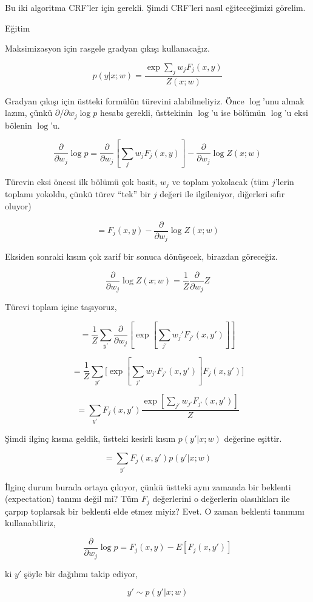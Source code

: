 \documentclass[12pt,fleqn]{article}\usepackage{../../common}
\begin{document}
Bu iki algoritma CRF'ler için gerekli. Şimdi CRF'leri nasıl eğiteceğimizi
görelim. 

Eğitim

Maksimizasyon için rasgele gradyan çıkışı kullanacağız. 

$$ 
p(y|x;w) = \frac{\exp \sum_j w_j F_j(x,y)  }{Z(x;w)}
$$

Gradyan çıkışı için üstteki formülün türevini alabilmeliyiz. Önce
$\log$'unu almak lazım, çünkü $\partial / \partial w_j \log p$ hesabı
gerekli, üsttekinin $\log$'u ise bölümün $\log$'u eksi bölenin $\log$'u.

$$
 \frac{\partial}{\partial w_j} \log p
=
\frac{\partial}{\partial w_j} [ \sum_j w_j F_j(x,y)] -
\frac{\partial}{\partial w_j} \log Z(x;w)
 $$

Türevin eksi öncesi ilk bölümü çok basit, $w_j$ ve toplam yokolacak (tüm
$j$'lerin toplamı yokoldu, çünkü türev ``tek'' bir $j$ değeri ile
ilgileniyor, diğerleri sıfır oluyor)


$$ 
= F_j(x,y) -
\frac{\partial}{\partial w_j} \log Z(x;w)
$$

Eksiden sonraki kısım çok zarif bir sonuca dönüşecek, birazdan göreceğiz. 

$$ 
\frac{\partial}{\partial w_j} \log Z(x;w) = 
\frac{1}{Z} \frac{\partial}{\partial w_j} Z 
$$

Türevi toplam içine taşıyoruz, 

$$ 
= \frac{1}{Z} \sum_{y'} \frac{\partial}{\partial w_j} [
\exp [ \sum_{j'} w_j' F_{j'}(x,y') ] ] 
$$

$$  
= \frac{1}{Z}\sum_{y'} 
\bigg[
\exp [ \sum_{j'} w_{j'} F_{j'}(x,y') ] F_j(x,y')
\bigg]
$$

$$ 
= \sum_{y'} F_j (x,y')
\frac{
\exp [ \sum_{j'} w_{j'} F_{j'}(x,y') ]
}
{Z}
$$ 

Şimdi ilginç kısma geldik, üstteki kesirli kısım $p(y' | x;w)$ değerine
eşittir. 

$$ = \sum_{y'} F_j (x,y') p(y' | x;w)$$ 

İlginç durum burada ortaya çıkıyor, çünkü üstteki aynı zamanda bir beklenti
(expectation) tanımı değil mi? Tüm $F_j$ değerlerini o değerlerin
olasılıkları ile çarpıp toplarsak bir beklenti elde etmez miyiz? Evet. O
zaman beklenti tanımını kullanabiliriz,

$$\frac{\partial}{\partial w_j} \log p = F_j(x,y) - E[F_j(x,y') ] $$

ki $y'$ şöyle bir dağılımı takip ediyor, 

$$ y' \sim p(y'|x;w) $$
\end{document}
